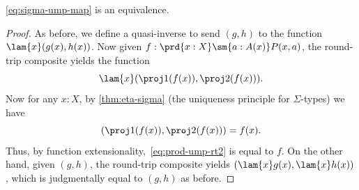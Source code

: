 %
\begin{thm}\label{thm:ttac}
  \eqref{eq:sigma-ump-map} is an equivalence.
\end{thm}

\begin{proof}
  As before, we define a quasi-inverse to send $(g,h)$ to the function $\lam{x} (g(x),h(x))$.
  Now given $f:\prd{x:X} \sm{a:A(x)} P(x,a)$, the round-trip composite yields the function
  \begin{equation}
    \lam{x} (\proj1(f(x)),\proj2(f(x))).\label{eq:prod-ump-rt2}
  \end{equation}
  Now for any $x:X$, by \cref{thm:eta-sigma} (the uniqueness principle for $\Sigma$-types) we have
  \begin{equation*}
    (\proj1(f(x)),\proj2(f(x))) = f(x).
  \end{equation*}
  Thus, by function extensionality,~\eqref{eq:prod-ump-rt2} is equal to $f$.
  On the other hand, given $(g,h)$, the round-trip composite yields $(\lam {x} g(x),\lam{x} h(x))$, which is judgmentally equal to $(g,h)$ as before.
\end{proof}
